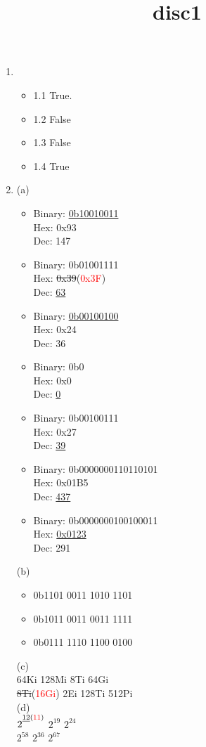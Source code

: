 \documentclass[12pt,a4paper]{article}
\title{disc1}
\begin{document}
\maketitle
	\begin{enumerate}
		\item 
		\begin{itemize}
			\item 1.1 True. 
			\item 1.2 False
			\item 1.3 False
			\item 1.4 True
		\end{itemize}
		\item 
		(a)
		\begin{itemize}
			\item 
				Binary:	\underline{0b10010011}\\
				Hex:	0x93\\
				Dec:	147
			\item 
				Binary:	0b01001111\\
				Hex:	\sout{0x39}(\textcolor{red}{0x3F})\\
				Dec:	\underline{63}
			\item 
				Binary:	\underline{0b00100100}\\	
				Hex:	0x24\\
				Dec:	36
			\item 
				Binary:	0b0\\
				Hex:	0x0\\
				Dec:	\underline{0}
			\item 
				Binary:	0b00100111\\
				Hex:	0x27\\
				Dec:	\underline{39}
			\item 
				Binary:	0b0000000110110101\\
				Hex:	0x01B5\\
				Dec:	\underline{437}
			\item 
				Binary:	0b0000000100100011\\
				Hex:	\underline{0x0123}\\
				Dec:	291
		\end{itemize}
	(b)	
		\begin{itemize}
			\item 0b1101 0011 1010 1101
			\item 0b1011 0011 0011 1111
			\item 0b0111 1110 1100 0100  
		\end{itemize}
	(c)\\
		64Ki	128Mi	8Ti		64Gi\\
		\sout{8Ti}(\textcolor{red}{16Gi})		2Ei		128Ti	512Pi\\
	(d)\\
		$ 2^{\sout{12}(\textcolor{red}{11})} $	$ 2^{19} $	$ 2^{24} $\\
		$ 2^{58} $	$ 2^{36} $	$ 2^{67} $
		

\end{enumerate}
\end{document}
